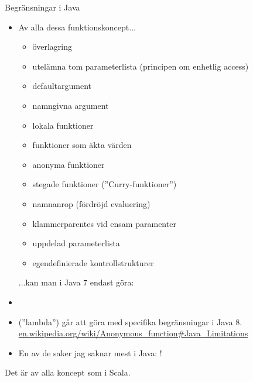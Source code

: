 \begin{Slide}{Begränsningar i Java}\SlideFontTiny
\begin{itemize}
\item Av alla dessa funktionskoncept...
\begin{itemize}\SlideFontTiny
\item överlagring
\item utelämna tom parameterlista (principen om enhetlig access)
\item defaultargument
\item namngivna argument
\item lokala funktioner
\item funktioner som äkta värden
\item anonyma funktioner
\item stegade funktioner (''Curry-funktioner'')
\item namnanrop (fördröjd evaluering)
\item klammerparentes vid ensam paramenter
\item uppdelad parameterlista
\item egendefinierade kontrollstrukturer
\end{itemize}
...kan man i Java 7 endast göra:  
\item {} 
\item {} (''lambda'') går att göra med specifika begränsningar i Java 8. \href{https://en.wikipedia.org/wiki/Anonymous_function\#Java_Limitations}{en.wikipedia.org/wiki/Anonymous\_function\#Java\_Limitations}
\item \vspace{0.5em} En av de saker jag saknar mest i Java: !
\end{itemize}
Det är  av alla koncept som  i Scala.

\end{Slide}



